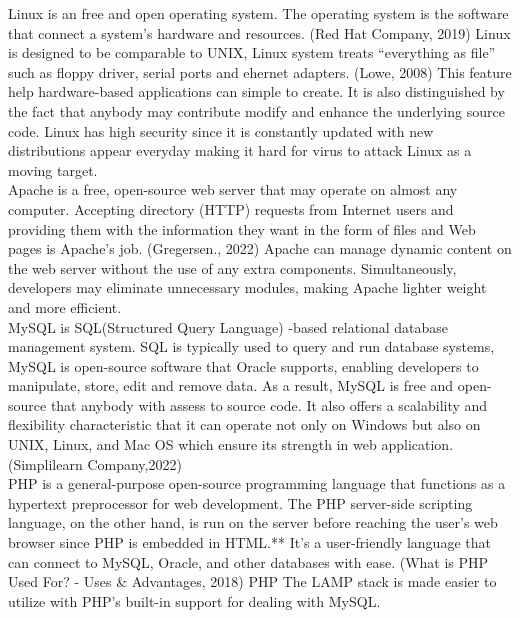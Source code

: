 \documentclass[a4paper, 11pt]{report}
\begin{document}
\noindent Linux is an free and open operating system. The operating system is the software that connect a system's hardware and resources. (Red Hat Company, 2019) Linux is designed to be comparable to UNIX,  Linux system treats “everything as file” such as floppy driver, serial ports and ehernet adapters.  (Lowe, 2008) This feature help hardware-based applications can simple to create. It is also distinguished by the fact that anybody may contribute modify and enhance the underlying source code. Linux has high security since it is constantly updated with new distributions appear everyday making it hard for virus to attack Linux as a moving target.\\

\noindent Apache is a free, open-source web server that may operate on almost any computer. Accepting directory (HTTP) requests from Internet users and providing them with the information they want in the form of files and Web pages is Apache's job. (Gregersen.,  2022) Apache can manage dynamic content on the web server without the use of any extra components. Simultaneously, developers may eliminate unnecessary modules, making Apache lighter weight and more efficient.\\

\noindent MySQL is SQL(Structured Query Language) -based relational database management system. SQL is typically used to query and run database systems, MySQL is open-source software that Oracle supports, enabling developers to manipulate, store, edit and remove data. As a result, MySQL is free and open-source that anybody with assess to source code. It also offers a scalability and flexibility characteristic that it can operate not only on Windows but also on UNIX, Linux, and Mac OS which ensure its strength in web application. (Simplilearn Company,2022) \\

\noindent PHP is a general-purpose open-source programming language that functions as a hypertext preprocessor for web development. The PHP server-side scripting language, on the other hand, is run on the server before reaching the user’s web browser since PHP is embedded in HTML.** It’s a user-friendly language that can connect to MySQL, Oracle, and other databases with ease. (What is PHP Used For? - Uses \& Advantages, 2018) PHP The LAMP stack is made easier to utilize with PHP’s built-in support for dealing with MySQL. \\
\end{document}
